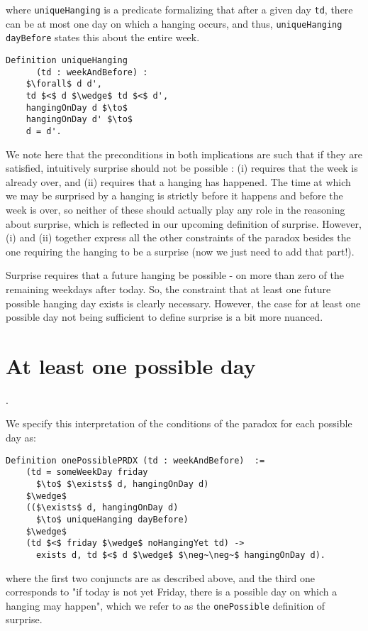 \documentclass[journal]{journal}
\begin{document}
where {\tt uniqueHanging} is a predicate formalizing that after a given day {\tt td},
there can be at most one day on which a hanging occurs, and thus,
{\tt uniqueHanging dayBefore} states this about the entire week.

\begin{lstlisting}[mathescape=true]
  Definition uniqueHanging
      (td : weekAndBefore) :
    $\forall$ d d',
    td $<$ d $\wedge$ td $<$ d',
    hangingOnDay d $\to$
    hangingOnDay d' $\to$
    d = d'.
\end{lstlisting}

We note here that the preconditions in both implications are such that if
they are satisfied, intuitively surprise should not be possible : (i)
requires that the week is already over, and (ii) requires that a hanging
has happened. The time at which we may be surprised by a hanging is strictly
before it happens and before the week is over, so neither of these should
actually play any role in the reasoning about surprise, which is reflected
in our upcoming definition of surprise. However, (i) and (ii) together express all the
other constraints of the paradox besides the one requiring the hanging to
be a surprise (now we just need to add that part!).

Surprise requires that a future hanging be possible - on more than zero
of the remaining weekdays after today.
So, the constraint that at least one future possible hanging day exists is
clearly necessary. However, the case for at least one possible day not
being sufficient to define surprise is a bit more nuanced.

\section{At least one possible day}.
\label{sec:one}

We specify this interpretation
of the conditions of the paradox for each possible day as:

\begin{lstlisting}[mathescape=true]
  Definition onePossiblePRDX (td : weekAndBefore)  :=
    (td = someWeekDay friday
      $\to$ $\exists$ d, hangingOnDay d)
    $\wedge$
    (($\exists$ d, hangingOnDay d)
      $\to$ uniqueHanging dayBefore)
    $\wedge$
    (td $<$ friday $\wedge$ noHangingYet td) ->
      exists d, td $<$ d $\wedge$ $\neg~\neg~$ hangingOnDay d).
\end{lstlisting}

where the first two conjuncts are as described above, and
the third one corresponds to "if today is not
  yet Friday, there is a possible day on which a hanging may happen", which
  we refer to as the {\tt onePossible} definition of surprise.
\end{document}
